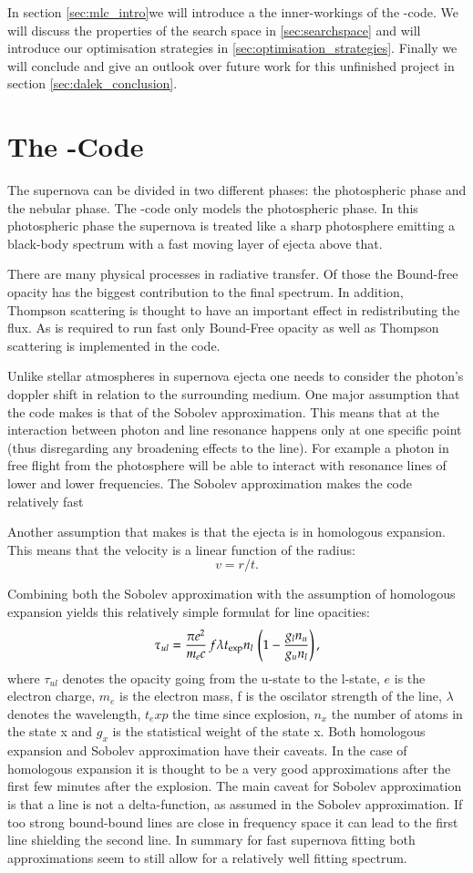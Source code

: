 In section \ref{sec:mlc_intro}we will introduce a the inner-workings of the \mlc-code.  We will discuss the properties of the search space in \ref{sec:searchspace} and will introduce our optimisation strategies in \ref{sec:optimisation_strategies}. Finally we will conclude and give an outlook over future work for this unfinished project in section \ref{sec:dalek_conclusion}.

\section{The \mlc-Code}
\label{sec:mlc_code}
The supernova can be divided in two different phases: the photospheric phase and the nebular phase. The \mlc-code only models the photospheric phase.
In this photospheric phase the supernova is treated like a sharp photosphere emitting a black-body spectrum with a fast moving layer of ejecta above that. 

There are many physical processes in radiative transfer. Of those the Bound-free opacity has the biggest contribution to the final spectrum. In addition, Thompson scattering is thought to have an important effect in redistributing the flux. As \mlc is required to run fast only Bound-Free opacity as well as Thompson scattering is implemented in the code.

Unlike stellar atmospheres in supernova ejecta one needs to consider the photon's doppler shift in relation to the surrounding medium. One major assumption that the code makes is that of the Sobolev approximation.  This means that at the interaction between photon and line resonance happens only at one specific point (thus disregarding any broadening effects to the line). For example a photon in free flight from the photosphere will be able to interact with resonance lines of lower and lower frequencies. The Sobolev approximation makes the code relatively fast 

Another assumption that \mlc makes is that the ejecta is in homologous expansion. This means that the velocity is a linear function of the radius:
\[
	v=  r / t.
\]

Combining both the Sobolev approximation with the assumption of homologous expansion yields this relatively simple formulat for line opacities:
\[
\tau_{ul} = \frac{\pi e^2}{m_e c}\, f \lambda t_{\rm exp} n_l\, \left(1 - \frac{g_l n_u}{g_u n_l}\right), 
\]
where $\tau_{ul}$ denotes the opacity going from the u-state to the l-state, $e$ is the electron charge, $m_e$ is the electron mass, f is the oscilator strength of the line, $\lambda$ denotes the wavelength, $t_exp$ the time since explosion, $n_x$ the number of atoms in the state x and $g_x$ is the statistical weight of the state x.
Both homologous expansion and Sobolev approximation have their caveats. In the case of homologous expansion it is thought to be a very good approximations after the first few minutes after the explosion. The main caveat for Sobolev approximation is that a line is not a delta-function, as assumed in the Sobolev approximation. If too strong bound-bound lines are close in frequency space it can lead to the first line shielding the second line. In summary for fast supernova fitting both approximations seem to still allow for a relatively well fitting spectrum.

